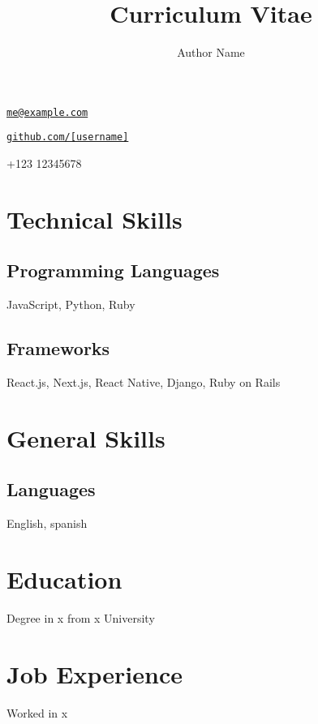 \documentclass{article}
\makeatletter
\renewcommand{\maketitle}{
\begin{center}
    {\huge\bfseries
    \theauthor}

    \vspace{.25em}

    \href{mailto:me@example.com}{\nolinkurl{me@example.com}}

    \vspace{.25em}

    \href{https://github.com/}{\nolinkurl{github.com/[username]}}

    \vspace{.25em}
    
    +123 12345678



\end{center}
}
\makeatother
\begin{document}
\title{Curriculum Vitae}
\author{Author Name}

\maketitle

\section{Technical Skills}

\subsection{Programming Languages}

JavaScript, Python, Ruby

\subsection{Frameworks}

React.js, Next.js, React Native, Django, Ruby on Rails

\section{General Skills}

\subsection{Languages}

English, spanish

\section{Education}

Degree in x from x University

\section{Job Experience}

Worked in x
\end{document}
